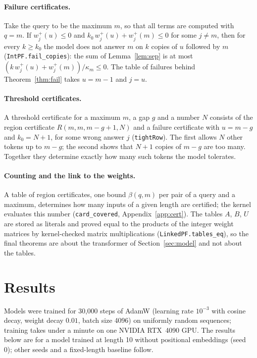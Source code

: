 \documentclass[11pt,a4paper]{article}
\newcommand{\lean}[1]{\texttt{#1}}
\begin{document}
\paragraph{Failure certificates.}
Take the query to be the maximum $m$, so that all terms are computed with $q=m$.
If $w^+_j(u)\le 0$ and $k_0\,w^+_j(u)+w^+_j(m)\le0$ for some $j\ne m$, then for
every $k\ge k_0$ the model does not answer $m$ on $k$ copies of $u$ followed by
$m$ (\lean{IntPF.fail\_copies}): the sum of Lemma~\ref{lem:sep} is at most
$(k\,w^+_j(u)+w^+_j(m))/\kappa_m\le0$. The table of failures behind
Theorem~\ref{thm:fail} takes $u=m-1$ and $j=u$.

\paragraph{Threshold certificates.}
A threshold certificate for a maximum $m$, a gap $g$ and a number $N$ consists
of the region certificate $R(m,m,m-g+1,N)$ and a failure certificate with
$u=m-g$ and $k_0=N+1$, for some wrong answer $j$ (\lean{tightRow}). The first
allows $N$ other tokens up to $m-g$; the second shows that $N+1$ copies of
$m-g$ are too many. Together they determine exactly how many such tokens the
model tolerates.

\paragraph{Counting and the link to the weights.}
A table of region certificates, one bound $\beta(q,m)$ per pair of a query and a
maximum, determines how many inputs of a given length are certified; the kernel
evaluates this number (\lean{card\_covered}, Appendix~\ref{app:cert}). The
tables $A$, $B$, $U$ are stored as literals and proved equal to the products of
the integer weight matrices by kernel-checked matrix multiplications
(\lean{LinkedPF.tables\_eq}), so the final theorems are about the transformer
of Section~\ref{sec:model} and not about the tables.

\section{Results}\label{sec:results}

Models were trained for 30{,}000 steps of AdamW (learning rate $10^{-3}$ with
cosine decay, weight decay $0.01$, batch size 4096) on uniformly random
sequences; training takes under a minute on one NVIDIA RTX~4090 GPU. The results
below are for a model trained at length 10 without positional embeddings (seed
0); other seeds and a fixed-length baseline follow.
\end{document}
